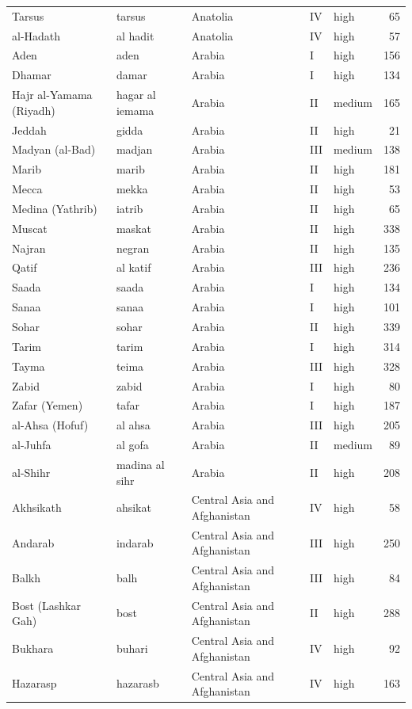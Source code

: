 \documentclass[11pt,a4paper]{article}
\begin{document}
{\begin{longtable}{p{4.6cm}p{3.0cm}p{3.6cm}llr}
Tarsus & tarsus & Anatolia & IV & high & 65\\
al-Hadath & al hadit & Anatolia & IV & high & 57\\
Aden & aden & Arabia & I & high & 156\\
Dhamar & damar & Arabia & I & high & 134\\
Hajr al-Yamama (Riyadh) & hagar al iemama & Arabia & II & medium & 165\\
Jeddah & gidda & Arabia & II & high & 21\\
Madyan (al-Bad) & madjan & Arabia & III & medium & 138\\
Marib & marib & Arabia & II & high & 181\\
Mecca & mekka & Arabia & II & high & 53\\
Medina (Yathrib) & iatrib & Arabia & II & high & 65\\
Muscat & maskat & Arabia & II & high & 338\\
Najran & negran & Arabia & II & high & 135\\
Qatif & al katif & Arabia & III & high & 236\\
Saada & saada & Arabia & I & high & 134\\
Sanaa & sanaa & Arabia & I & high & 101\\
Sohar & sohar & Arabia & II & high & 339\\
Tarim & tarim & Arabia & I & high & 314\\
Tayma & teima & Arabia & III & high & 328\\
Zabid & zabid & Arabia & I & high & 80\\
Zafar (Yemen) & tafar & Arabia & I & high & 187\\
al-Ahsa (Hofuf) & al ahsa & Arabia & III & high & 205\\
al-Juhfa & al gofa & Arabia & II & medium & 89\\
al-Shihr & madina al sihr & Arabia & II & high & 208\\
Akhsikath & ahsikat & Central Asia and Afghanistan & IV & high & 58\\
Andarab & indarab & Central Asia and Afghanistan & III & high & 250\\
Balkh & balh & Central Asia and Afghanistan & III & high & 84\\
Bost (Lashkar Gah) & bost & Central Asia and Afghanistan & II & high & 288\\
Bukhara & buhari & Central Asia and Afghanistan & IV & high & 92\\
Hazarasp & hazarasb & Central Asia and Afghanistan & IV & high & 163\\

\end{longtable}}
\end{document}
